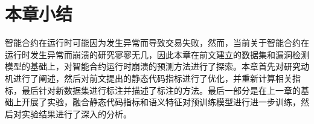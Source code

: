 \section{本章小结}
\label{sec:本章小结5}

智能合约在运行时可能因为发生异常而导致交易失败，然而，当前关于智能合约在运行时发生异常而崩溃的研究寥寥无几，因此本章在前文建立的数据集和漏洞检测模型的基础上，对智能合约运行时崩溃的预测方法进行了探索。本章首先对研究动机进行了阐述，然后对前文提出的静态代码指标进行了优化，并重新计算相关指标，最后针对新数据集进行标注并描述了标注的方法。最后一部分是在上一章的基础上开展了实验，融合静态代码指标和语义特征对预训练模型进行进一步训练，然后对实验结果进行了深入的分析。